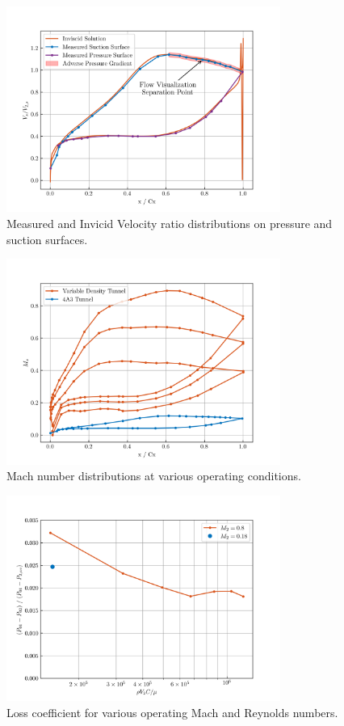 \documentclass{article}
\begin{document}
\begin{figure}[H]
    \centering
    \includegraphics[width=0.8\textwidth]{figures/lift_plot.png}
    \caption{Measured and Invicid Velocity ratio distributions on pressure and suction surfaces.}
    \label{fig:lift_plot}
\end{figure}
\begin{figure}[H]
    \centering
    \includegraphics[width=0.8\textwidth]{figures/mach_plot.png}
    \caption{Mach number distributions at various operating conditions.}
    \label{fig:mach_plot}
\end{figure}
\begin{figure}[H]
    \centering
    \includegraphics[width=0.8\textwidth]{figures/reynolds_plot.png}
    \caption{Loss coefficient for various operating Mach and Reynolds numbers.}
    \label{fig:reynolds_plot}
\end{figure}
\end{document}
